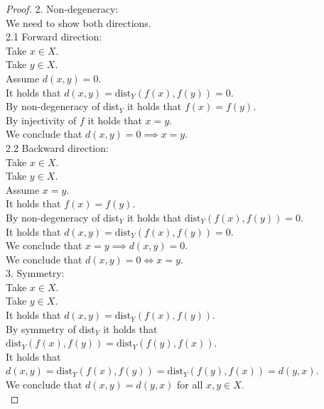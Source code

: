 \documentclass{article}
\theoremstyle{mytheoremstyle}
\theoremstyle{mytheoremstyle}
\theoremstyle{myproblemstyle}
\begin{document}
\begin{proof}
        2. Non-degeneracy: \\
        We need to show both directions. \\
        2.1 Forward direction: \\
        Take $x \in X$. \\
        Take $y \in X$. \\
        Assume $d(x,y) = 0$. \\
        It holds that $d(x,y) = \text{dist}_Y(f(x),f(y)) = 0$. \\
        By non-degeneracy of dist$_Y$ it holds that $f(x) = f(y)$. \\
        By injectivity of $f$ it holds that $x = y$. \\
        We conclude that $d(x,y) = 0 \implies x = y$. \\
        2.2 Backward direction: \\
        Take $x \in X$. \\
        Take $y \in X$. \\
        Assume $x = y$. \\
        It holds that $f(x) = f(y)$. \\
        By non-degeneracy of dist$_Y$ it holds that $\text{dist}_Y(f(x),f(y)) = 0$. \\
        It holds that $d(x,y) = \text{dist}_Y(f(x),f(y)) = 0$. \\
        We conclude that $x = y \implies d(x,y) = 0$. \\
        We conclude that $d(x,y) = 0 \iff x = y$. \\

        3. Symmetry: \\
        Take $x \in X$. \\
        Take $y \in X$. \\
        It holds that $d(x,y) = \text{dist}_Y(f(x),f(y))$. \\
        By symmetry of dist$_Y$ it holds that $\text{dist}_Y(f(x),f(y)) = \text{dist}_Y(f(y),f(x))$. \\
        It holds that $d(x,y) = \text{dist}_Y(f(x),f(y)) = \text{dist}_Y(f(y),f(x)) = d(y,x)$. \\
        We conclude that $d(x,y) = d(y,x)$ for all $x,y \in X$. \\


\end{proof}
\end{document}

